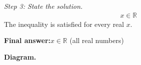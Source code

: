 \documentclass[11pt]{article}
\begin{document}
\textit{Step 3: State the solution.}
\[\begin{gathered}
x \in \mathbb{R}
\end{gathered}\]
The inequality is satisfied for every real \( x \).

\begin{answerbox}
\textbf{Final answer:}\quad \(\displaystyle x \in \mathbb{R}\) (all real numbers)
\end{answerbox}
\textbf{Diagram.}

\begin{center}
\end{center}
\end{document}
